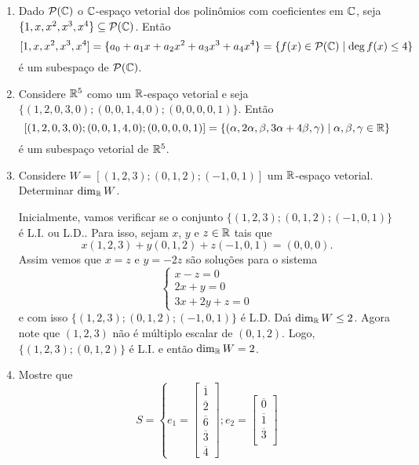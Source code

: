 \begin{exemplo}
	\begin{enumerate}[label={\arabic*})]
		\item Dado $\mathcal{P}(\mathbb{C})$ o $\mathbb{C}$-espa\c{c}o vetorial dos polin\^omios com coeficientes em $\mathbb{C}$, seja $\{1,x,x^2,x^3,x^4\} \subseteq \mathcal{P}(\mathbb{C})$. Ent\~ao
		\[
			[1,x,x^2,x^3,x^4] = \{a_0 + a_1x + a_2x^2 + a_3x^3 + a_4x^4\} = \{f(x) \in \mathcal{P}(\mathbb{C}) \mid \deg f(x) \le 4\}
		\]
		\'e um subespa\c{c}o de $\mathcal{P}(\mathbb{C})$.
		\item Considere $\mathbb{R}^5$ como um $\mathbb{R}$-espa\c{c}o vetorial e seja $\{(1,2,0,3,0);(0,0,1,4,0);(0,0,0,0,1)\}$. Ent\~ao
		\[
			[(1,2,0,3,0);(0,0,1,4,0);(0,0,0,0,1)] = \{(\alpha, 2\alpha,\beta,3\alpha + 4\beta,\gamma) \mid \alpha, \beta, \gamma \in \mathbb{R}\}
		\]
		\'e um subespa\c{c}o vetorial de $\mathbb{R}^5$.
		\item Considere $W = [(1,2,3);(0,1,2);(-1,0,1)]$ um $\mathbb{R}$-espa\c{c}o vetorial. Determinar $\dim_{\mathbb{R}} W$.
		\begin{solucao}
			Inicialmente, vamos verificar se o conjunto $\{(1,2,3);(0,1,2);(-1,0,1)\}$ \'e L.I. ou L.D.. Para isso, sejam $x$, $y$ e $z \in \mathbb{R}$ tais que
			\[
				x(1,2,3) + y(0,1,2) + z(-1,0,1) = (0,0,0).
			\]
			Assim vemos que $x = z$ e $y = -2z$ s\~ao solu\c{c}\~oes para o sistema
			\[
				\begin{cases}
					x - z = 0\\
					2x + y = 0\\
					3x + 2y + z = 0
				\end{cases}
			\]
			e com isso $\{(1,2,3);(0,1,2);(-1,0,1)\}$ \'e L.D. Da{\'\i} $\dim_{\mathbb{R}} W \le 2$. Agora note que $(1,2,3)$ n\~ao \'e m\'ultiplo escalar de $(0,1,2)$. Logo, $\{(1,2,3); (0,1,2)\}$ \'e L.I. e ent\~ao $\dim_{\mathbb{R}} W = 2$.
		\end{solucao}
		\item Mostre que
		\[
			S = \left\{ e_1 = \begin{bmatrix}
				\overline{1}\\
				\overline{2}\\
				\overline{6}\\
				\overline{3}\\
				\overline{4}
			\end{bmatrix}; e_2 = \begin{bmatrix}
				\overline{0}\\
				\overline{1}\\
				\overline{3}\\

\end{bmatrix}\]
\end{enumerate}
\end{exemplo}
